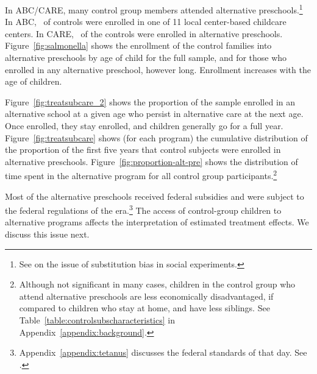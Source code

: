 In ABC/CARE, many control group members attended alternative preschools.\footnote{See \cite{Heckman_Hohmann_etal_2000_QJE} on the issue of substitution bias in social experiments.} In ABC, \treatsubsabc\ of controls were enrolled in one of 11 local center-based childcare centers. In CARE, \treatsubscarec\ of the controls were enrolled in alternative preschools. Figure~\ref{fig:salmonella} shows the enrollment of the control families into alternative preschools by age of child for the full sample, and for those who enrolled in any alternative preschool, however long. Enrollment increases with the age of children.

Figure~\ref{fig:treatsubcare_2} shows the proportion of the sample enrolled in an alternative school at a given age who persist in alternative care at the next age. Once enrolled, they stay enrolled, and children generally go for a full year.  Figure~\ref{fig:treatsubcare} shows (for each program) the cumulative distribution of the proportion of the first five years that control subjects were enrolled in alternative preschools. Figure~\ref{fig:proportion-alt-pre} shows the distribution of time spent in the alternative program for all control group participants.\footnote{Although not significant in many cases, children in the control group who attend alternative preschools are less economically disadvantaged, if compared to children who stay at home, and have less siblings. See Table~\ref{table:controlsubscharacteristics} in Appendix~\ref{appendix:background}.}

Most of the alternative preschools received federal subsidies and were subject to the federal regulations of the era.\footnote{Appendix~\ref{appendix:tetanus} discusses the federal standards of that day. See \citet{Department-of-Health_1968_DayCareRequirements,NCGA_1971_House-Bill-100,Ramey-et-al_1977_Intro-to-ABC,Ramey_Campbell_1979_SR,Ramey_McGinness_etal_1982_Abecedarianapproach, Burchinal_Campbell_etal_1997_CD}.} The access of control-group children to alternative programs affects the interpretation of estimated treatment effects. We discuss this issue next.

